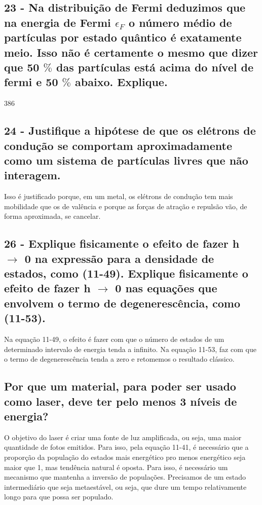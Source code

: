\documentclass{article}
\begin{document}
\subsection{23 - Na distribuição de Fermi deduzimos que na energia de Fermi $\epsilon_F$ o número médio de partículas por estado quântico é exatamente meio. Isso não é certamente o mesmo que dizer que 50 $\%$ das partículas está acima do nível de fermi e 50 $\%$ abaixo. Explique.}

386

\subsection{24 - Justifique a hipótese de que os elétrons de condução se comportam aproximadamente como um sistema de partículas livres que não interagem.}
Isso é justificado porque, em um metal, os elétrons de condução tem mais mobilidade que os de valência e porque as forças de atração e repulsão vão, de forma aproximada, se cancelar.

\subsection{26 - Explique fisicamente o efeito de fazer h $\to$ 0 na expressão para a densidade de estados, como (11-49). Explique fisicamente o efeito de fazer h $\to$ 0 nas equações que envolvem o termo de degenerescência, como (11-53).}
Na equação 11-49, o efeito é fazer com que o número de estados de um determinado intervalo de energia tenda a infinito.
Na equação 11-53, faz com que o termo de degenerescência tenda a zero e retomemos o resultado clássico.



\subsection{Por que um material, para poder ser usado como laser, deve ter pelo menos 3 níveis de energia?
}
O objetivo do laser é criar uma fonte de luz amplificada, ou seja, uma maior quantidade de fotos emitidos. Para isso, pela equação 11-41, é necessário que a proporção da população do estados mais energético pro menos energético seja maior que 1, mas tendência natural é oposta. Para isso, é necessário um mecanismo que mantenha a inversão de populações. Precisamos de um estado intermediário que seja metaestável, ou seja, que dure um tempo relativamente longo para que possa ser populado.

\pagebreak
\end{document}
